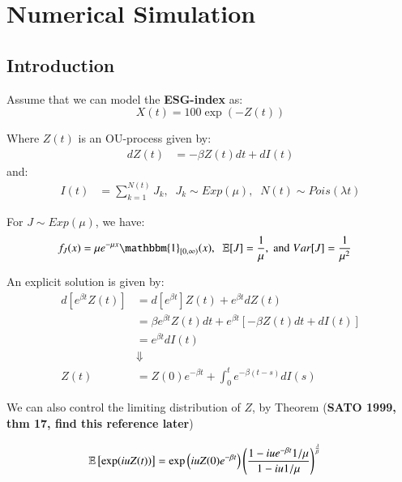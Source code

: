 \chapter{Numerical Simulation}

\section{Introduction}

Assume that we can model the \textbf{ESG-index} as: 
\[
X(t) = 100\exp(-Z(t))
\]

Where $Z(t)$ is an OU-process given by: 
\begin{align*}
dZ(t) &= -\beta Z(t)dt + dI(t)    
\end{align*} 
and: 
\begin{align*}
I(t) &= \sum_{k=1}^{N(t)}J_{k}, \;\; J_{k}\sim Exp(\mu),\;\; N(t) \sim Pois(\lambda t)    
\end{align*} 

For $J\sim Exp(\mu)$, we have:
\begin{align*}
f_{J}(x) &= \mu e^{-\mu x}\mathbbm{1}_{[0,\infty)}(x), \;\; 
\E[J] = \frac{1}{\mu}, \;\text{and}\; Var[J] = \frac{1}{\mu^{2}}
\end{align*}

An explicit solution is given by: 
\begin{align}
\label{eq: characteristic_function_Z(t)}
d[e^{\beta t}Z(t)] &= d[e^{\beta t}]Z(t) + e^{\beta t}dZ(t) \nonumber \\ 
&= \beta e^{\beta t}Z(t)dt + e^{\beta t}[-\beta Z(t)dt + dI(t)]
\nonumber \\ 
&= e^{\beta t}dI(t) \nonumber \\ 
&\Downarrow \nonumber\\ 
Z(t) &= Z(0)e^{-\beta t} + \int_{0}^{t}e^{-\beta (t-s)}dI(s)
\end{align} 


We can also control the limiting distribution of $Z$, by Theorem (\textbf{SATO 1999, thm 17, find this reference later}) 

\newpage 

\begin{proposition}
\begin{align*}
\mathbb{E}\left[
\exp(iu Z(t))
\right] 
&= 
\exp\left(
iuZ(0)e^{-\beta t}\right)
\left(
\frac{
1-iue^{-\beta t}1/\mu}
{
1-iu1/\mu
}
\right)^{\frac{\lambda}{\beta}}
\end{align*}
\end{proposition}

